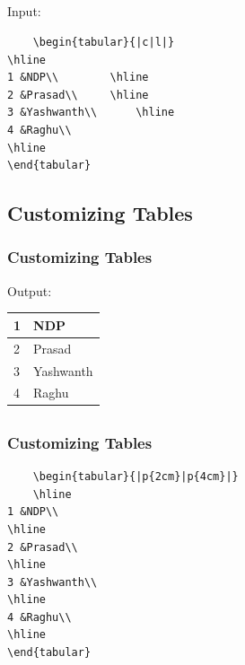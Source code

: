 \documentclass[12pt]{beamer}
\begin{document}
\begin{frame}[fragile]
\section{         }
\frametitle{}
Input:
\begin{center}
	\begin{verbatim}
	\begin{tabular}{|c|l|}
\hline
1 &NDP\\		\hline
2 &Prasad\\		\hline
3 &Yashwanth\\		\hline
4 &Raghu\\
\hline
\end{tabular}
\end{verbatim}
\end{center}
\end{frame}
\begin{frame}
\section{Customizing Tables         }
\frametitle{Customizing Tables}
Output:
\begin{center}
	\begin{tabular}{|p{2cm}|p{4cm}|}
	\hline
	1 &NDP\\		\hline
	2 &Prasad\\		\hline
	3 &Yashwanth\\		\hline
	4 &Raghu\\
	\hline
\end{tabular}
\end{center}
\end{frame}
\begin{frame}[fragile]
\section{         }
\frametitle{Customizing Tables  }

\begin{verbatim}
	\begin{tabular}{|p{2cm}|p{4cm}|}
	\hline
1 &NDP\\		
\hline
2 &Prasad\\		
\hline
3 &Yashwanth\\		
\hline
4 &Raghu\\
\hline
\end{tabular}
\end{verbatim}

\end{frame}
\end{document}

